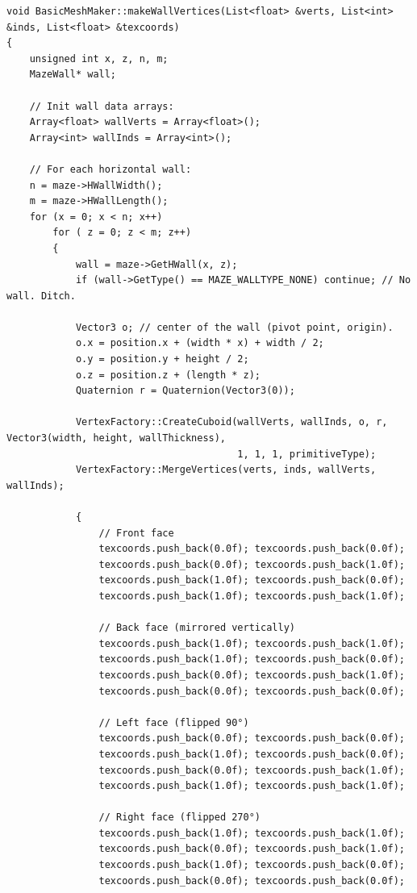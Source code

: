 \lstCpp
\begin{lstlisting}[caption= The \texttt{BasicMeshMaker} class]
void BasicMeshMaker::makeWallVertices(List<float> &verts, List<int> &inds, List<float> &texcoords)
{
    unsigned int x, z, n, m;
    MazeWall* wall;
    
    // Init wall data arrays:
    Array<float> wallVerts = Array<float>();
    Array<int> wallInds = Array<int>();
    
    // For each horizontal wall:
    n = maze->HWallWidth();
    m = maze->HWallLength();
    for (x = 0; x < n; x++)
        for ( z = 0; z < m; z++)
        {
            wall = maze->GetHWall(x, z);
            if (wall->GetType() == MAZE_WALLTYPE_NONE) continue; // No wall. Ditch.
            
            Vector3 o; // center of the wall (pivot point, origin).
            o.x = position.x + (width * x) + width / 2;
            o.y = position.y + height / 2;
            o.z = position.z + (length * z);
            Quaternion r = Quaternion(Vector3(0));
            
            VertexFactory::CreateCuboid(wallVerts, wallInds, o, r, Vector3(width, height, wallThickness),
                                        1, 1, 1, primitiveType);
            VertexFactory::MergeVertices(verts, inds, wallVerts, wallInds);
            
            {
                // Front face
                texcoords.push_back(0.0f); texcoords.push_back(0.0f);
                texcoords.push_back(0.0f); texcoords.push_back(1.0f);
                texcoords.push_back(1.0f); texcoords.push_back(0.0f);
                texcoords.push_back(1.0f); texcoords.push_back(1.0f);
                
                // Back face (mirrored vertically)
                texcoords.push_back(1.0f); texcoords.push_back(1.0f);
                texcoords.push_back(1.0f); texcoords.push_back(0.0f);
                texcoords.push_back(0.0f); texcoords.push_back(1.0f);
                texcoords.push_back(0.0f); texcoords.push_back(0.0f);
                
                // Left face (flipped 90°)
                texcoords.push_back(0.0f); texcoords.push_back(0.0f);
                texcoords.push_back(1.0f); texcoords.push_back(0.0f);
                texcoords.push_back(0.0f); texcoords.push_back(1.0f);
                texcoords.push_back(1.0f); texcoords.push_back(1.0f);
                
                // Right face (flipped 270°)
                texcoords.push_back(1.0f); texcoords.push_back(1.0f);
                texcoords.push_back(0.0f); texcoords.push_back(1.0f);
                texcoords.push_back(1.0f); texcoords.push_back(0.0f);
                texcoords.push_back(0.0f); texcoords.push_back(0.0f);
                

\end{lstlisting}
